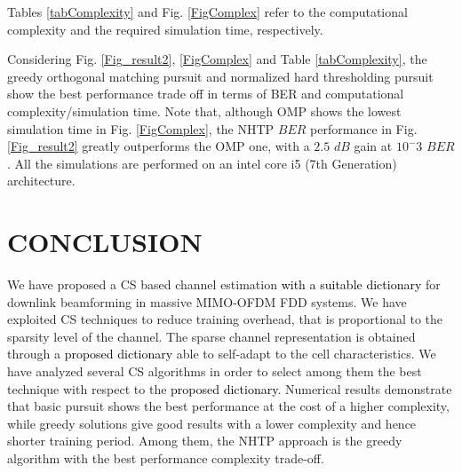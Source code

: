 %

Tables \ref{tabComplexity} and Fig. \ref{FigComplex} refer to the computational complexity and the required simulation time, respectively.

Considering Fig. \ref{Fig_result2}, \ref{FigComplex} and Table \ref{tabComplexity}, the greedy orthogonal matching pursuit and normalized hard thresholding pursuit show the best performance trade off in terms of BER and computational complexity/simulation time. Note that, although OMP shows the lowest simulation time in Fig. \ref{FigComplex}, the NHTP $BER$ performance in Fig. \ref{Fig_result2} greatly outperforms the OMP one, with a $2.5$ $dB$ gain at $10^-3$ $BER$. All the simulations are performed on an intel core i5 (7th Generation) architecture.

\section{CONCLUSION}
\label{Concl}
We have proposed a CS based channel estimation \textcolor{black}{with a suitable dictionary} for downlink beamforming in massive MIMO-OFDM FDD systems. We have exploited CS techniques to reduce training overhead, that is proportional to the sparsity level of the channel. The sparse channel representation is obtained through a \textcolor{black}{proposed dictionary} able to self-adapt to the cell characteristics. 
We have analyzed several CS algorithms in order to select among them the best technique with respect to the \textcolor{black}{proposed dictionary}. Numerical results demonstrate that basic pursuit shows the best performance at the cost of a higher complexity, while greedy solutions give good results with a lower complexity and hence shorter training period. Among them, the NHTP approach is the greedy algorithm with the best performance complexity trade-off.
